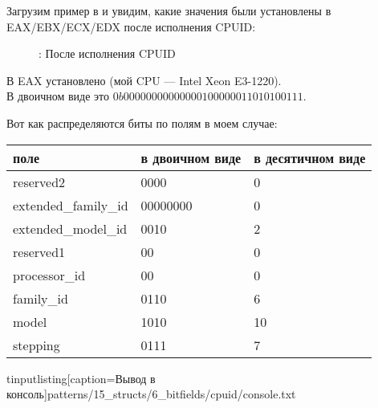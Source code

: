 ﻿\clearpage
{}
\myindex{\olly}

Загрузим пример в \olly и увидим, какие значения были установлены в EAX/EBX/ECX/EDX после исполнения CPUID: 

\begin{figure}[H]
\centering
{}
\caption{\olly: После исполнения CPUID}
\label{fig:cpuid_olly_1}
\end{figure}

В EAX установлено  (мой \ac{CPU} --- Intel Xeon E3-1220).\\
В двоичном виде это $0b0000 0000 0000 0010 0000 0110 1010 0111$.

Вот как распределяются биты по полям в моем случае:

\begin{center}
\begin{tabular}{ | l | l | l | }
\hline
\headercolor{} поле &
\headercolor{} в двоичном виде &
\headercolor{} в десятичном виде \\
\hline
reserved2		& 0000 & 0 \\
\hline
extended\_family\_id	& 00000000 & 0 \\
\hline
extended\_model\_id	& 0010 & 2 \\
\hline
reserved1		& 00 & 0 \\
\hline
processor\_id		& 00 & 0 \\
\hline
family\_id		& 0110 & 6 \\
\hline
model			& 1010 & 10 \\
\hline
stepping		& 0111 & 7 \\
\hline
\end{tabular}
\end{center}

tinputlisting[caption=Вывод в консоль]{patterns/15_structs/6_bitfields/cpuid/console.txt}


